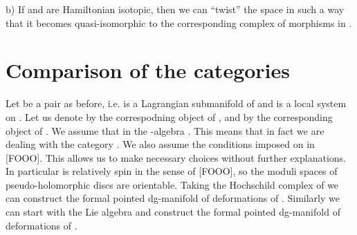 \documentclass[a4paper,12pt]{article}
\begin{document}
b) If \coordHE{} and \coordHE{} are Hamiltonian isotopic, then we can
``twist'' the space 
\coordHE{} in such a way that it becomes
quasi-isomorphic to the corresponding complex of morphisms in \coordHE{}.



\section{Comparison of the categories}
 
Let \coordHE{} be a pair as before, i.e.
\coordHE{} is a Lagrangian submanifold of \coordHE{}
and \myHighlight{$\rho$}\coordHE{} is a local system on \coordHE{}. Let us denote by \coordHE{}
the correspodning object of \coordHE{}, and by \coordHE{} the corresponding
object of \coordHE{}. 
We assume that  \coordHE{} in the
\myHighlight{$\A$}\coordHE{}-algebra \coordHE{}. This means that in fact we are dealing
with the category \coordHE{}. We also assume the conditions
imposed on \coordHE{} in [FOOO]. This allows us to make necessary
choices without further explanations. In particular \coordHE{} is relatively spin
in the sense of [FOOO], so the moduli spaces of pseudo-holomorphic
discs are orientable. Taking the Hochschild complex of \coordHE{}
we can construct the formal pointed dg-manifold \coordHE{}
of deformations of \coordHE{}.
Similarly we can start with the Lie
 algebra \coordHE{}
and construct the formal pointed dg-manifold
\coordHE{} of deformations of \coordHE{}. 
 
\end{document}
